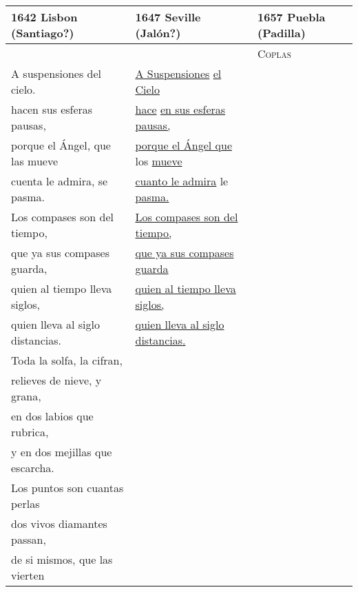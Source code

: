 \documentclass{vcfloat}
\begin{document}
\begin{tabular}{lll}
    \toprule
    1642 Lisbon (Santiago?) & 
    1647 Seville (Jalón?) & 
    1657 Puebla (Padilla) \\
    \midrule 
 
    &
    &
    \textsc{Coplas} \\


    \strophe{} A suspensiones del cielo. &
    \strophe{} \uline{A Suspensiones} \uline{el Cielo} & 
    \\

    hacen sus esferas pausas, &
    \uline{hace} \uline{en sus esferas pausas,} &
    \\

    porque el Ángel, que las mueve &
    \uline{porque el Ángel que} los \uline{mueve} &
    \\

    cuenta le admira, se pasma. &
    \uline{cuanto le admira} le \uline{pasma.} &
    \\

    \strophe{} Los compases son del tiempo, &
    \strophe{} \uline{Los compases son del tiempo,} &
    \\

    que ya sus compases guarda, &
    \uline{que ya sus compases guarda} &
    \\

    quien al tiempo lleva siglos, &
    \uline{quien al tiempo lleva siglos,} &
    \\

    quien lleva al siglo distancias. &
    \uline{quien lleva al siglo distancias.} &
    \\

    \strophe{} Toda la solfa, la cifran, &
    & \\

    relieves de nieve, y grana, &
    & \\

    en dos labios que rubrica, &
    & \\

    y en dos mejillas que escarcha. &
    & \\

    \strophe{} Los puntos son cuantas perlas &
    & \\

    dos vivos diamantes passan, &
    & \\

    de si mismos, que las vierten &
    & \\


\end{tabular}
\end{document}
